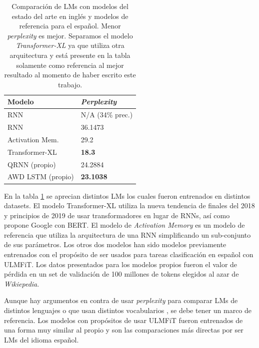 \begin{table}
\centering
\begin{tabular}{|l|l|}
\hline
\textbf{Modelo} & \textbf{\textit{Perplexity}} \\
\hline
RNN \parencite{goldszmidt2018} & N/A (34\% prec.) \\
RNN \parencite{ingham2018} & 36.1473 \\
Activation Mem. \parencite{rae2018} & 29.2 \\
\hline
Transformer-XL \parencite{dai2019} & \textbf{18.3} \\
\hline
QRNN (propio) & 24.2884 \\
AWD LSTM (propio) & \textbf{23.1038} \\



\hline

\end{tabular}
\caption{Comparación de LMs con modelos del estado del arte en inglés y modelos de referencia para el español. Menor \textit{perplexity} es mejor. Separamos el modelo \textit{Transformer-XL} ya que utiliza otra arquitectura y está presente en la tabla solamente como referencia al mejor resultado al momento de haber escrito este trabajo.}
\label{tab:lmcomp}
\end{table}

En la tabla \ref{tab:lmcomp} se aprecian distintos LMs los cuales fueron entrenados en distintos datasets. El modelo Transformer-XL \parencite{dai2019} utiliza la nueva tendencia de finales del 2018 y principios de 2019 de usar transformadores en lugar de RNNs, así como propone Google con BERT. El modelo de \textit{Activation Memory} \parencite{rae2018} es un modelo de referencia que utiliza la arquitectura de una RNN simplificando un sub-conjunto de sus parámetros. Los otros dos modelos han sido modelos previamente entrenados con el propósito de ser usados para tareas clasificación en español con ULMFiT. Los datos presentados para los modelos propios fueron el valor de pérdida en un set de validación de 100 millones de tokens elegidos al azar de \textit{Wikiepedia}.

Aunque hay argumentos en contra de usar \textit{perplexity} para comparar LMs de distintos lenguajes o que usan distintos vocabularios \parencite{chen1998evaluation}, se debe tener un marco de referencia. Los modelos con propósitos de usar ULMFiT fueron entrenados de una forma muy similar al propio y son las comparaciones más directas por ser LMs del idioma español.


